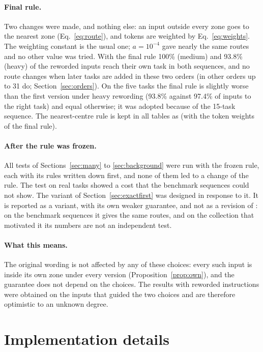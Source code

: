 \paragraph{Final rule.} Two changes were made, and nothing else: an input outside every zone goes
to the nearest zone (Eq.~\ref{eq:route}), and tokens are weighted by Eq.~\eqref{eq:weights}. The
weighting constant is the usual one; $a = 10^{-4}$ gave nearly the same routes and no other value
was tried. With the final rule 100\% (medium) and 93.8\% (heavy) of the reworded inputs reach their
own task in both sequences, and no route changes when later tasks are added in these two orders (in other orders up to 31 do; Section~\ref{sec:orders}). On the five tasks the
final rule is slightly worse than the first version under heavy rewording (93.8\% against 97.4\% of
inputs to the right task) and equal otherwise; it was adopted because of the 15-task sequence. The
nearest-centre rule is kept in all tables as \centre{} (with the token weights of the final rule).

\paragraph{After the rule was frozen.} All tests of Sections~\ref{sec:many} to
\ref{sec:background} were run with the frozen rule, each with its rules written down first, and
none of them led to a change of the rule. The test on \ManyTasks{} real tasks showed a cost that the
benchmark sequences could not show. The variant \exactfirst{} of Section~\ref{sec:exactfirst} was
designed in response to it. It is reported as a variant, with its own weaker guarantee, and not as
a revision of \cert{}: on the benchmark sequences it gives the same routes, and on the
collection that motivated it its numbers are not an independent test.

\paragraph{What this means.} The original wording is not affected by any of these choices: every
such input is inside its own zone under every version (Proposition~\ref{prop:own}), and the
guarantee does not depend on the choices. The results with reworded instructions were obtained on
the inputs that guided the two choices and are therefore optimistic to an unknown degree.

\FloatBarrier
\section{Implementation details}
\label{app:impl}

